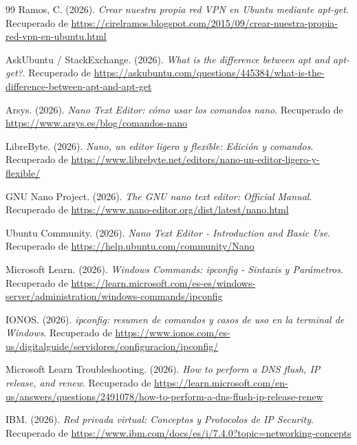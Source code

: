 \documentclass[a4paper,12pt]{article}
\begin{document}
\begin{thebibliography}{99}
    Ramos, C. (2026). \textit{Crear nuestra propia red VPN en Ubuntu mediante apt-get}. Recuperado de \url{https://cirelramos.blogspot.com/2015/09/crear-nuestra-propia-red-vpn-en-ubuntu.html}

    AskUbuntu / StackExchange. (2026). \textit{What is the difference between apt and apt-get?}. Recuperado de \url{https://askubuntu.com/questions/445384/what-is-the-difference-between-apt-and-apt-get}

    Arsys. (2026). \textit{Nano Text Editor: cómo usar los comandos nano}. Recuperado de \url{https://www.arsys.es/blog/comandos-nano}

    LibreByte. (2026). \textit{Nano, un editor ligero y flexible: Edición y comandos}. Recuperado de \url{https://www.librebyte.net/editors/nano-un-editor-ligero-y-flexible/}

    GNU Nano Project. (2026). \textit{The GNU nano text editor: Official Manual}. Recuperado de \url{https://www.nano-editor.org/dist/latest/nano.html}

    Ubuntu Community. (2026). \textit{Nano Text Editor - Introduction and Basic Use}. Recuperado de \url{https://help.ubuntu.com/community/Nano}

    Microsoft Learn. (2026). \textit{Windows Commands: ipconfig - Sintaxis y Parámetros}. Recuperado de \url{https://learn.microsoft.com/es-es/windows-server/administration/windows-commands/ipconfig}

    IONOS. (2026). \textit{ipconfig: resumen de comandos y casos de uso en la terminal de Windows}. Recuperado de \url{https://www.ionos.com/es-us/digitalguide/servidores/configuracion/ipconfig/}

    Microsoft Learn Troubleshooting. (2026). \textit{How to perform a DNS flush, IP release, and renew}. Recuperado de \url{https://learn.microsoft.com/en-us/answers/questions/2491078/how-to-perform-a-dns-flush-ip-release-renew}

    IBM. (2026). \textit{Red privada virtual: Conceptos y Protocolos de IP Security}. Recuperado de \url{https://www.ibm.com/docs/es/i/7.4.0?topic=networking-concepts}

\end{thebibliography}
\end{document}
